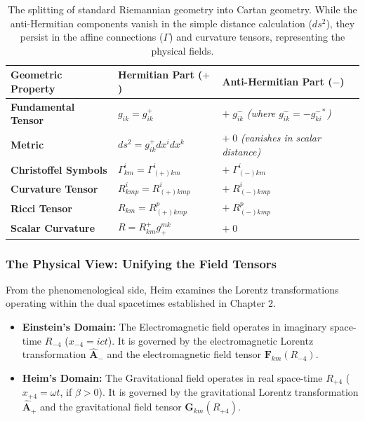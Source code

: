 \documentclass[11pt,a4paper,oneside]{article}
\begin{document}
\begin{table}[htbp]
\centering
\renewcommand{\arraystretch}{1.6}
\begin{tabular}{lll}
\toprule
\textbf{Geometric Property} & \textbf{Hermitian Part ($+$)} & \textbf{Anti-Hermitian Part ($-$)} \\
\midrule
\rowcolor{theoryblue!5}
\textbf{Fundamental Tensor} & $g_{ik} = g_{ik}^+$ & $+ \; g_{ik}^-$ \quad \textit{(where $g_{ik}^- = -g_{ki}^{-*}$)} \\
\textbf{Metric} & $ds^2 = g_{ik}^+ dx^i dx^k$ & $+ \; 0$ \quad \textit{(vanishes in scalar distance)} \\
\rowcolor{theoryblue!5}
\textbf{Christoffel Symbols} & $\Gamma_{km}^i = \Gamma_{(+)km}^i$ & $+ \; \Gamma_{(-)km}^i$ \\
\textbf{Curvature Tensor} & $R_{kmp}^i = R_{(+)kmp}^i$ & $+ \; R_{(-)kmp}^i$ \\
\rowcolor{theoryblue!5}
\textbf{Ricci Tensor} & $R_{km} = R_{(+)kmp}^p$ & $+ \; R_{(-)kmp}^p$ \\
\textbf{Scalar Curvature} & $R = R_{km}^+ g^{mk}_+$ & $+ \; 0$ \\
\bottomrule
\end{tabular}
\caption{The splitting of standard Riemannian geometry into Cartan geometry. While the anti-Hermitian components vanish in the simple distance calculation ($ds^2$), they persist in the affine connections ($\Gamma$) and curvature tensors, representing the physical fields.}
\end{table}
\subsubsection{The Physical View: Unifying the Field Tensors}

From the phenomenological side, Heim examines the Lorentz transformations operating within the dual spacetimes established in Chapter 2. 

\begin{itemize}
    \item \textbf{Einstein's Domain:} The Electromagnetic field operates in imaginary space-time $R_{-4}$ ($x_{-4} = ict$). It is governed by the electromagnetic Lorentz transformation $\hat{\mathbf{A}}_-$ and the electromagnetic field tensor $\mathbf{F}_{km}(R_{-4})$.
    \item \textbf{Heim's Domain:} The Gravitational field operates in real space-time $R_{+4}$ ($x_{+4} = \omega t$, if $\beta > 0$). It is governed by the gravitational Lorentz transformation $\hat{\mathbf{A}}_+$ and the gravitational field tensor $\mathbf{G}_{km}(R_{+4})$.
\end{itemize}
\end{document}
